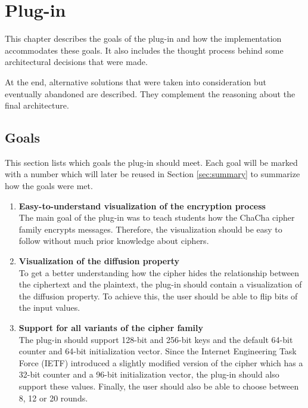 
\chapter{Plug-in}
\label{chap:Plugin}

This chapter describes the goals of the plug-in and how the implementation accommodates these goals. It also includes the thought process behind some architectural decisions that were made.

At the end, alternative solutions that were taken into consideration but eventually abandoned are described. They complement the reasoning about the final architecture.

\section{Goals}
\label{sec:goals}

This section lists which goals the plug-in should meet. Each goal will be marked with a number which will later be reused in Section \ref{sec:summary} to summarize how the goals were met.

\begin{enumerate}[label=(\labelenum{G}{{\arabic*}})]
  \item \textbf{Easy-to-understand visualization of the encryption process}\\
The main goal of the plug-in was to teach students how the ChaCha cipher family encrypts messages. Therefore, the visualization should be easy to follow without much prior knowledge about ciphers.
  \item \textbf{Visualization of the diffusion property}\\
To get a better understanding how the cipher hides the relationship between the ciphertext and the plaintext, the plug-in should contain a visualization of the diffusion property. To achieve this, the user should be able to flip bits of the input values.
  \item \textbf{Support for all variants of the cipher family}\\
The plug-in should support 128-bit and 256-bit keys and the default 64-bit counter and 64-bit initialization vector. Since the Internet Engineering Task Force (IETF) introduced a slightly modified version of the cipher which has a 32-bit counter and a 96-bit initialization vector, the plug-in should also support these values. Finally, the user should also be able to choose between 8, 12 or 20 rounds.
\end{enumerate}

